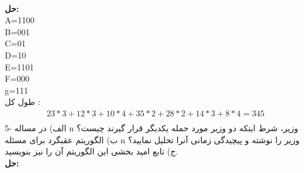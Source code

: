 \documentclass{book}
\begin{document}
\\
\textbf{حل:}\\
A=1100 \\ B=001\\ C=01 \\ D=10 \\ E=1101 \\ F=000 \\ g=111 \\

طول کل :
 \begin{align*}
23*3+12*3+10*4+35*2+28*2+14*3+8*4=345 \\ 
\end{align*}
5- الف) در مساله n وزیر، شرط اینکه دو وزیر مورد حمله یکدیگر قرار گیرند چیست؟\\
ب) الگوریتم عقبگرد برای مسئله n وزیر را نوشته و پیچیدگی زمانی آنرا تحلیل نمایید؟\\
ج) تابع امید بخشی این الگوریتم آن را نیز بنویسید.\\
\textbf{حل:}\\
\end{document}
